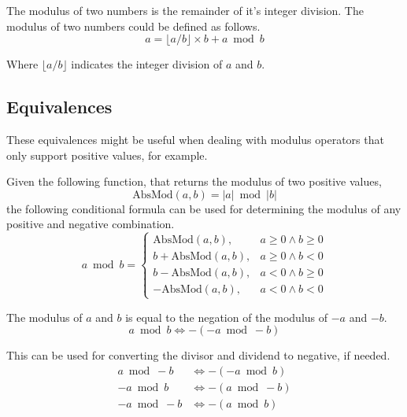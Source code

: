 \documentclass{amsart}
\begin{document}
The modulus of two numbers is the remainder of it's integer division. The
modulus of two numbers could be defined as follows.
\begin{equation*}
  a = \lfloor a / b \rfloor \times b + a \bmod b
\end{equation*}

Where $\lfloor a / b \rfloor$ indicates the integer division of $a$ and $b$.

\subsection{Equivalences}

These equivalences might be useful when dealing with modulus operators that only
support positive values, for example.

\bigskip

Given the following function, that returns the modulus of two positive values,
\begin{equation*}
  \text{AbsMod}(a, b) = |a| \bmod |b|
\end{equation*}
the following conditional formula can be used for determining the modulus of any
positive and negative combination.
\begin{equation*}
  a \bmod b =
  \begin{cases}
    \text{AbsMod}(a, b),     & a \geq 0 \land b \geq 0 \\
    b + \text{AbsMod}(a, b), & a \geq 0 \land b < 0 \\
    b - \text{AbsMod}(a, b), & a < 0 \land b \geq 0 \\
    -\text{AbsMod}(a, b),    & a < 0 \land b < 0
  \end{cases}
\end{equation*}

\bigskip

The modulus of $a$ and $b$ is equal to the negation of the modulus of $-a$ and
$-b$.
\begin{equation*}
  a \bmod  b \iff - \left( -a \bmod -b \right)
\end{equation*}

This can be used for converting the divisor and dividend to negative, if needed.
\begin{align*}
   a \bmod -b & \iff - \left( -a \bmod  b \right) \\
  -a \bmod  b & \iff - \left(  a \bmod -b \right) \\
  -a \bmod -b & \iff - \left(  a \bmod  b \right)
\end{align*}
\end{document}
